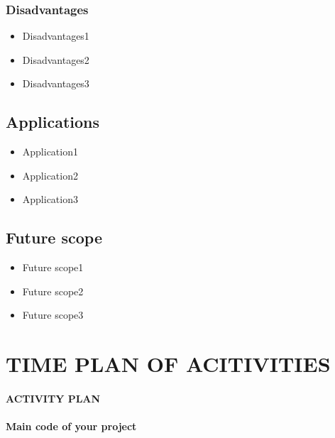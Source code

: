 \documentclass[12pt]{report}	%
\begin{document}
\subsection{Disadvantages}
\begin{itemize}
    \item Disadvantages1
\item Disadvantages2
\item Disadvantages3
\end{itemize}
\section{Applications}
\begin{itemize}
    \item Application1
\item Application2
\item Application3
\end{itemize}
\section{Future scope }
\begin{itemize}
    \item Future scope1
\item Future scope2
\item Future scope3
\end{itemize}


\newpage
\chapter{TIME PLAN OF ACITIVITIES}

\subsubsection{ACTIVITY PLAN}
  \begin{figure}[h!]
    \begin{center}
    \end{center}
    \end{figure}



\subsubsection{Main code of  your project}
   \begin{figure}[h!]
    \begin{center}
    \end{center}
    \end{figure}
\end{document}
